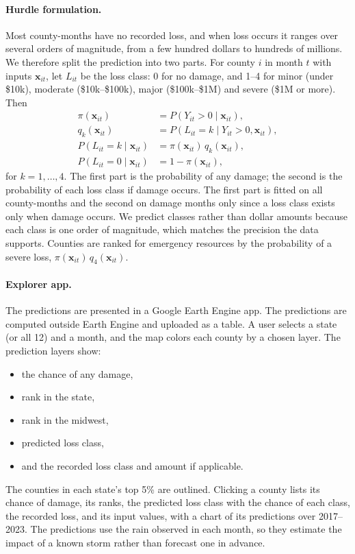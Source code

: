 \documentclass[10pt,twocolumn]{article}
\begin{document}
\paragraph{Hurdle formulation.} Most county-months have no recorded loss, and when loss occurs it
ranges over several orders of magnitude, from a few hundred dollars to hundreds of millions. We
therefore split the prediction into two parts. For county $i$ in month $t$ with inputs
$\mathbf{x}_{it}$, let $L_{it}$ be the loss class: 0 for no damage, and 1--4 for minor (under
\$10k), moderate (\$10k--\$100k), major (\$100k--\$1M) and severe (\$1M or more). Then
\begin{align}
\pi(\mathbf{x}_{it}) &= P(Y_{it} > 0 \mid \mathbf{x}_{it}), \\
q_k(\mathbf{x}_{it}) &= P(L_{it} = k \mid Y_{it} > 0, \mathbf{x}_{it}), \\
P(L_{it} = k \mid \mathbf{x}_{it}) &= \pi(\mathbf{x}_{it}) \, q_k(\mathbf{x}_{it}), \\
P(L_{it} = 0 \mid \mathbf{x}_{it}) &= 1 - \pi(\mathbf{x}_{it}),
\end{align}
for $k = 1, \dots, 4$.
The first part is the probability of any damage; the second is the probability of each loss class if
damage occurs. The first part is fitted on all county-months and the second on damage months
only since a loss class exists only when damage occurs. We predict classes rather than dollar amounts because each class is one order of magnitude,
which matches the precision the data supports. Counties are ranked for emergency resources by the
probability of a severe loss, $\pi(\mathbf{x}_{it}) \, q_4(\mathbf{x}_{it})$. 

\paragraph{Explorer app.} The predictions are presented in a Google Earth Engine app. The
predictions are computed outside Earth Engine and uploaded as a table. A user selects a state (or
all 12) and a month, and the map colors each county by a chosen layer. The prediction layers
show:
\begin{itemize}
  \item the chance of any damage,
  \item rank in the state,
  \item rank in the midwest, 
  \item predicted loss class, 
  \item and the recorded loss class and amount if applicable.
\end{itemize}
The counties in each state's top 5\% are outlined.  Clicking a county lists its chance of damage, its ranks, the predicted loss class with the chance of each class, the recorded loss, and its input values,
with a chart of its predictions over 2017--2023. The predictions use the rain observed in each
month, so they estimate the impact of a known storm rather than forecast one in advance.
\end{document}
